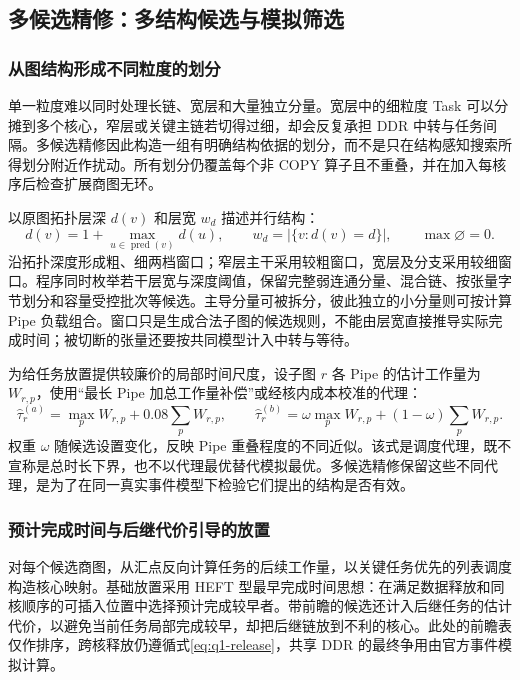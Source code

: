 \subsection{多候选精修：多结构候选与模拟筛选}
\subsubsection{从图结构形成不同粒度的划分}
单一粒度难以同时处理长链、宽层和大量独立分量。宽层中的细粒度 Task 可以分摊到多个核心，窄层或关键主链若切得过细，却会反复承担 DDR 中转与任务间隔。多候选精修因此构造一组有明确结构依据的划分，而不是只在结构感知搜索所得划分附近作扰动。所有划分仍覆盖每个非 COPY 算子且不重叠，并在加入每核序后检查扩展商图无环。

以原图拓扑层深 $d(v)$ 和层宽 $w_d$ 描述并行结构：
\begin{equation}\label{eq:q1-layer-depth}
d(v)=1+\max_{u\in\operatorname{pred}(v)}d(u),\qquad
w_d=|\{v:d(v)=d\}|,\qquad\max\varnothing=0.
\end{equation}
沿拓扑深度形成粗、细两档窗口；窄层主干采用较粗窗口，宽层及分支采用较细窗口。程序同时枚举若干层宽与深度阈值，保留完整弱连通分量、混合链、按张量字节划分和容量受控批次等候选。主导分量可被拆分，彼此独立的小分量则可按计算 Pipe 负载组合。窗口只是生成合法子图的候选规则，不能由层宽直接推导实际完成时间；被切断的张量还要按共同模型计入中转与等待。

为给任务放置提供较廉价的局部时间尺度，设子图 $r$ 各 Pipe 的估计工作量为 $W_{r,p}$，使用“最长 Pipe 加总工作量补偿”或经核内成本校准的代理：
\begin{equation}\label{eq:q1-allin-proxy}
\widehat\tau_r^{(a)}=\max_p W_{r,p}+0.08\sum_p W_{r,p},\qquad
\widehat\tau_r^{(b)}=\omega\max_p W_{r,p}+(1-\omega)\sum_p W_{r,p}.
\end{equation}
权重 $\omega$ 随候选设置变化，反映 Pipe 重叠程度的不同近似。该式是调度代理，既不宣称是总时长下界，也不以代理最优替代模拟最优。多候选精修保留这些不同代理，是为了在同一真实事件模型下检验它们提出的结构是否有效。

\subsubsection{预计完成时间与后继代价引导的放置}
对每个候选商图，从汇点反向计算任务的后续工作量，以关键任务优先的列表调度构造核心映射。基础放置采用 HEFT 型最早完成时间思想\cite{topcuoglu}：在满足数据释放和同核顺序的可插入位置中选择预计完成较早者。带前瞻的候选还计入后继任务的估计代价，以避免当前任务局部完成较早，却把后继链放到不利的核心。此处的前瞻表仅作排序，跨核释放仍遵循式\eqref{eq:q1-release}，共享 DDR 的最终争用由官方事件模拟计算。

